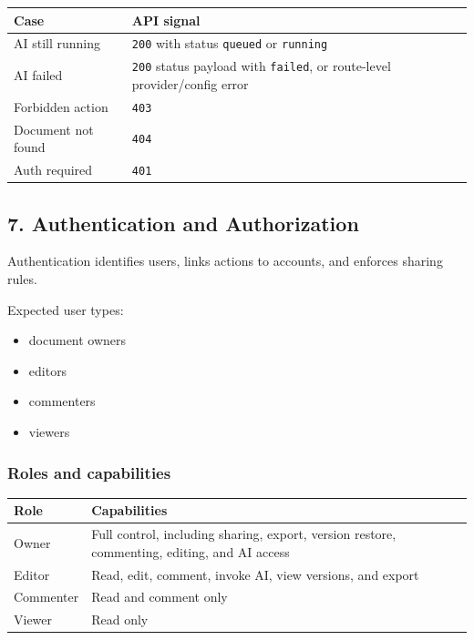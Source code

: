 \documentclass[a4paper]{article}
\providecommand{\tightlist}{%
  \setlength{\itemsep}{0pt}\setlength{\parskip}{0pt}}
\begin{document}
\begin{table}[h]
\small
\begin{tabularx}{\textwidth}{@{}L{38mm}Y@{}}
\toprule
Case & API signal \\
\midrule
AI still running & \texttt{200} with status \texttt{queued} or \texttt{running} \\
AI failed & \texttt{200} status payload with \texttt{failed}, or route-level provider/config error \\
Forbidden action & \texttt{403} \\
Document not found & \texttt{404} \\
Auth required & \texttt{401} \\
\bottomrule
\end{tabularx}
\end{table}

\subsection{7. Authentication and
Authorization}\label{7-authentication-and-authorization}

Authentication identifies users, links actions to accounts, and enforces
sharing rules.

Expected user types:

\begin{itemize}
\tightlist
\item
  document owners
\item
  editors
\item
  commenters
\item
  viewers
\end{itemize}

\subsubsection{Roles and capabilities}\label{roles-and-capabilities}

\begin{table}[h]
\small
\begin{tabularx}{\textwidth}{@{}L{22mm}Y@{}}
\toprule
Role & Capabilities \\
\midrule
Owner & Full control, including sharing, export, version restore, commenting, editing, and AI access \\
Editor & Read, edit, comment, invoke AI, view versions, and export \\
Commenter & Read and comment only \\
Viewer & Read only \\
\bottomrule
\end{tabularx}
\end{table}
\end{document}
